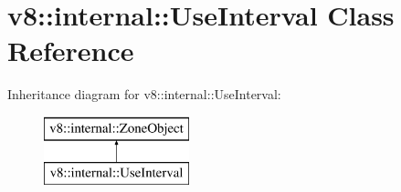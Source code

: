 \hypertarget{classv8_1_1internal_1_1_use_interval}{}\section{v8\+:\+:internal\+:\+:Use\+Interval Class Reference}
\label{classv8_1_1internal_1_1_use_interval}
Inheritance diagram for v8\+:\+:internal\+:\+:Use\+Interval\+:\begin{figure}[H]
\begin{center}
\leavevmode
\includegraphics[height=2.000000cm]{classv8_1_1internal_1_1_use_interval}
\end{center}
\end{figure}
